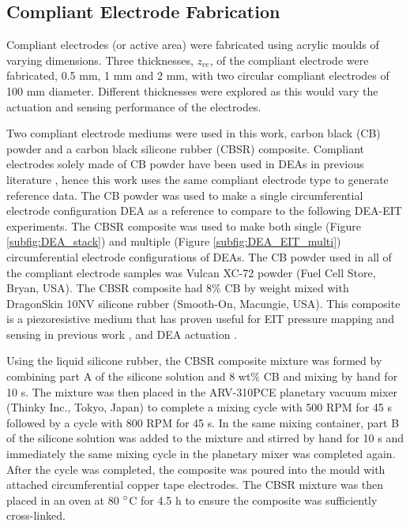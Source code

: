	
	\subsection{Compliant Electrode Fabrication}
	\label{subsec:dea_elec_fab}
	Compliant electrodes (or active area) were fabricated using acrylic moulds of varying dimensions. Three thicknesses, $z_{ce}$, of the compliant electrode were fabricated, 0.5 mm, 1 mm and 2 mm, with two circular compliant electrodes of 100 mm diameter. Different thicknesses were explored as this would vary the actuation and sensing performance of the electrodes.
	
	Two compliant electrode mediums were used in this work, carbon black (CB) powder and a carbon black silicone rubber (CBSR) composite. Compliant electrodes solely made of CB powder have been used in DEAs in previous literature\cite{Carpi2015, Huang2022, Shigemune2018} , hence this work uses the same compliant electrode type to generate reference data. The CB powder was used to make a single circumferential electrode configuration DEA as a reference to compare to the following DEA-EIT experiments. The CBSR composite was used to make both single (Figure \ref{subfig:DEA_stack}) and multiple (Figure \ref{subfig:DEA_EIT_multi}) circumferential electrode configurations of DEAs. The CB powder used in all of the compliant electrode samples was Vulcan XC-72 powder (Fuel Cell Store, Bryan, USA). The CBSR composite had 8\% CB by weight mixed with DragonSkin 10NV silicone rubber (Smooth-On, Macungie, USA). This composite is a piezoresistive medium that has proven useful for EIT pressure mapping and sensing in previous work\cite{Ellingham2024} , and DEA actuation\cite{Carpi2015, Huang2022} .
	
	Using the liquid silicone rubber, the CBSR composite mixture was formed by combining part A of the silicone solution and 8 wt\% CB and mixing by hand for 10 s. The mixture was then placed in the ARV-310PCE planetary vacuum mixer (Thinky Inc., Tokyo, Japan) to complete a mixing cycle with 500 RPM for 45 s followed by a cycle with 800 RPM for 45 s. In the same mixing container, part B of the silicone solution was added to the mixture and stirred by hand for 10 s and immediately the same mixing cycle in the planetary mixer was completed again. After the cycle was completed, the composite was poured into the mould with attached circumferential copper tape electrodes. The CBSR mixture was then placed in an oven at 80 $\degree$C for 4.5 h to ensure the composite was sufficiently cross-linked.
	
